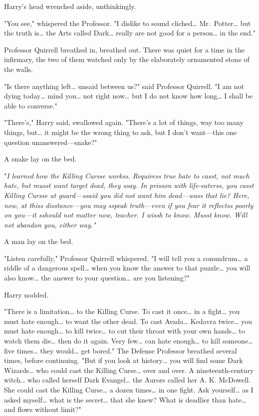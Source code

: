 Harry's head wrenched aside, unthinkingly.

"You see," whispered the Professor. "I dislike to sound cliched{\ldots} Mr.~Potter{\ldots} but the truth is{\ldots} the Arts called Dark{\ldots} really are not good for a person{\ldots} in the end."

Professor Quirrell breathed in, breathed out. There was quiet for a time in the infirmary, the two of them watched only by the elaborately ornamented stone of the walls.

"Is there anything left{\ldots} unsaid between us?" said Professor Quirrell. "I am not dying today{\ldots} mind you{\ldots} not right now{\ldots} but I do not know how long{\ldots} I shall be able to converse."

"There's," Harry said, swallowed again. "There's a lot of things, way too many things, but{\ldots} it might be the wrong thing to ask, but I don't want---this one question unanswered---snake?"

A snake lay on the bed.

"\emph{I learned how the Killing Cursse workss. Requiress true hate to casst, not much hate, but musst want target dead, they ssay. In prisson with life-eaterss, you casst Killing Cursse at guard---ssaid you did not want him dead---wass that lie? Here, now, at thiss disstance---you may sspeak truth---even if you fear it reflectss poorly on you---it sshould not matter now, teacher. I wissh to know. Musst know. Will not abandon you, either way."}

A man lay on the bed.

"Listen carefully," Professor Quirrell whispered. "I will tell you a conundrum{\ldots} a riddle of a dangerous spell{\ldots} when you know the answer to that puzzle{\ldots} you will also know{\ldots} the answer to your question{\ldots} are you listening?"

Harry nodded.

"There is a limitation{\ldots} to the Killing Curse. To cast it once{\ldots} in a fight{\ldots} you must hate enough{\ldots} to want the other dead. To cast Avada{\ldots} Kedavra twice{\ldots} you must hate enough{\ldots} to kill twice{\ldots} to cut their throat with your own hands{\ldots} to watch them die{\ldots} then do it again. Very few{\ldots} can hate enough{\ldots} to kill someone{\ldots} five times{\ldots} they would{\ldots} get bored." The Defense Professor breathed several times, before continuing. "But if you look at history{\ldots} you will find some Dark Wizards{\ldots} who could cast the Killing Curse{\ldots} over and over. A nineteenth-century witch{\ldots} who called herself Dark Evangel{\ldots} the Aurors called her A. K. McDowell. She could cast the Killing Curse{\ldots} a dozen times{\ldots} in one fight. Ask yourself{\ldots} as I asked myself{\ldots} what is the secret{\ldots} that she knew? What is deadlier than hate{\ldots} and flows without limit?"

